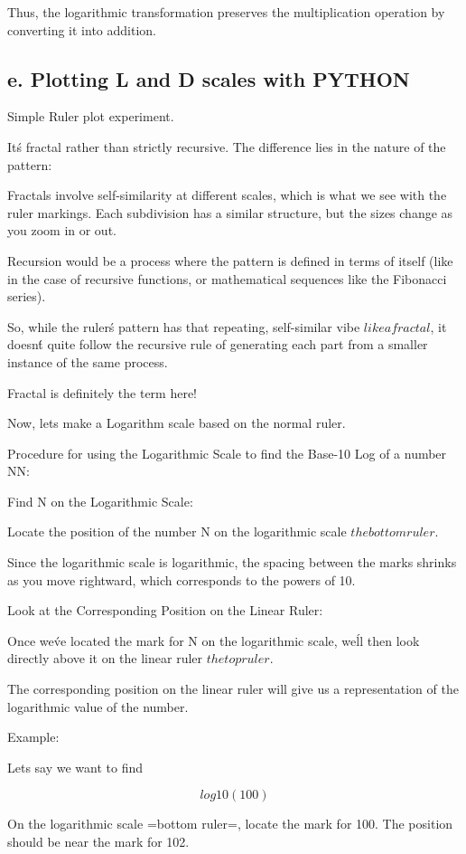 \documentclass[10pt,twocolumn]{article}
\begin{document}
Thus, the logarithmic transformation preserves the multiplication operation by converting it into addition.


\subsection*{e. Plotting L and D scales with PYTHON}

Simple Ruler plot experiment.

It\'s fractal rather than strictly recursive. The difference lies in the nature of the pattern:

Fractals involve self-similarity at different scales, which is what we see with the ruler markings. Each subdivision has a similar structure, but the sizes change as you zoom in or out.

Recursion would be a process where the pattern is defined in terms of itself (like in the case of recursive functions, or mathematical sequences like the Fibonacci series).

So, while the ruler\'s pattern has that repeating, self-similar vibe \(like a fractal\), it doesn\'t quite follow the recursive rule of generating each part from a smaller instance of the same process.

Fractal is definitely the term here!

Now, lets make a Logarithm scale based on the normal ruler.

Procedure for using the Logarithmic Scale to find the Base-10 Log of a number NN:

Find N on the Logarithmic Scale:

Locate the position of the number N on the logarithmic scale \(the bottom ruler\).

Since the logarithmic scale is logarithmic, the spacing between the marks shrinks as you move rightward, which corresponds to the powers of 10.

Look at the Corresponding Position on the Linear Ruler:

Once we\'ve located the mark for N on the logarithmic scale, we\'ll then look directly above it on the linear ruler \( the top ruler \).

The corresponding position on the linear ruler will give us a representation of the logarithmic value of the number.

Example:

Lets say we want to find 

\[ 
log10(100)
\]

On the logarithmic scale =bottom ruler=, locate the mark for 100. The position should be near the mark for 102.
\end{document}
